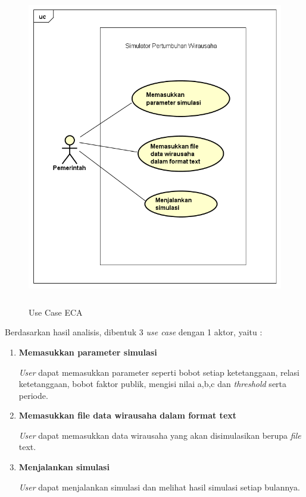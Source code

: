 	\begin{figure} [H]
		\centering  
		\includegraphics[width=14cm, height=14cm]{UseCase2} 
		\caption[Use Case ECA]{Use Case ECA} 
		\label{fig:usecase} 
	\end{figure}
	
Berdasarkan hasil analisis, dibentuk 3 \textit{use case} dengan 1 aktor, yaitu :
\begin{enumerate}
	\item \textbf{Memasukkan parameter simulasi}
	
	\textit{User} dapat memasukkan parameter seperti bobot setiap ketetanggaan, relasi ketetanggaan, bobot faktor publik, mengisi nilai a,b,c dan \textit{threshold} serta periode.
	\item \textbf{Memasukkan file data wirausaha dalam format text}
	
	\textit{User} dapat memasukkan data wirausaha yang akan disimulasikan berupa \textit{file} text.
	\item \textbf{Menjalankan simulasi}
	
	\textit{User} dapat menjalankan simulasi dan melihat hasil simulasi setiap bulannya.
\end{enumerate}

